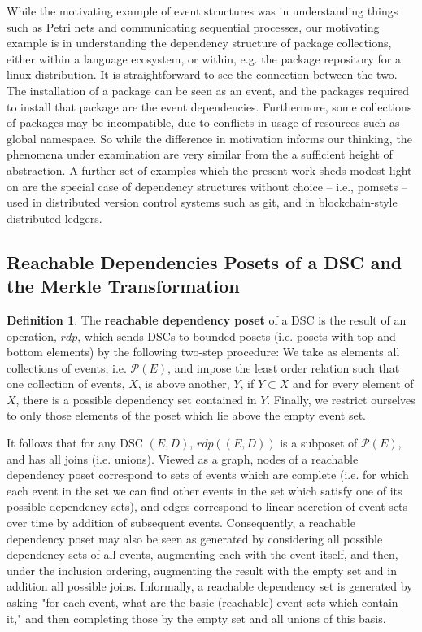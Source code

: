 \documentclass[hoptionsi,review,format=sigplan]{acmart}
\theoremstyle{definition}
\newtheorem{definition}{Definition}[section]
\newcommand{\Pc}{\mathcal{P}}
\begin{document}
While the motivating example of event structures was in understanding things such as Petri nets and communicating sequential processes, our motivating example is in understanding the dependency structure of package collections, either within a language ecosystem, or within, e.g. the package repository for a linux distribution. It is straightforward to see the connection between the two. The installation of a package can be seen as an event, and the packages required to install that package are the event dependencies. Furthermore, some collections of packages may be incompatible, due to conflicts in usage of resources such as global namespace. So while the difference in motivation informs our thinking, the phenomena under examination are very similar from the a sufficient height of abstraction. A further set of examples which the present work sheds modest light on are the special case of dependency structures without choice -- i.e., pomsets -- used in distributed version control systems such as git, and in blockchain-style distributed ledgers.

\subsection{Reachable Dependencies Posets of a DSC and the Merkle Transformation}

\begin{definition} The \textbf{reachable dependency poset} of a DSC is the result of an operation, \(rdp\), which sends DSCs to bounded posets (i.e. posets with top and bottom elements) by the following two-step procedure:  We take as elements all collections of events, i.e. \(\Pc(E)\), and impose the least order relation such that one collection of events, \(X\), is above another, \(Y\), if \(Y \subset X\) and for every element of \(X\), there is a possible dependency set contained in \(Y\).  Finally, we restrict ourselves to only those elements of the poset which lie above the empty event set. 
\end{definition}

It follows that for any DSC \((E,D)\), \(rdp((E,D))\)  is a subposet of \(\Pc(E)\), and has all joins (i.e. unions). Viewed as a graph, nodes of a reachable dependency poset correspond to sets of events which are complete (i.e. for which each event in the set we can find other events in the set which satisfy one of its possible dependency sets), and edges correspond to linear accretion of event sets over time by addition of subsequent events. Consequently, a reachable dependency poset may also be seen as generated by considering all possible dependency sets of all events, augmenting each with the event itself, and then, under the inclusion ordering, augmenting the result with the empty set and in addition all possible joins. Informally, a reachable dependency set is generated by asking "for each event, what are the basic (reachable) event sets which contain it," and then completing those by the empty set and all unions of this basis.
\end{document}
